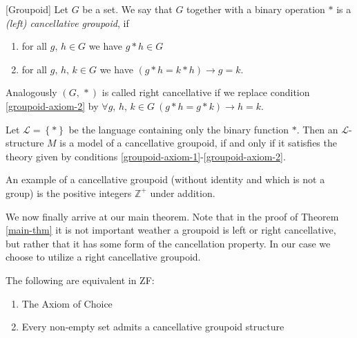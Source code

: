 \documentclass[../../main.tex]{subfiles}
\begin{document}
\begin{definition}\label{groupoid-def}[Groupoid]
    Let $G$ be a set.
    We say that $G$ together with a binary operation $*$ is a \emph{(left) cancellative groupoid}, if 
    \begin{enumerate}[label=(\roman*)]
        \item \label{groupoid-axiom-1} for all $g,\, h \in G$ we have $g * h \in G$
        \item \label{groupoid-axiom-2} for all $g,\, h,\, k \in G$ we have $\left(g * h = k * h\right) \rightarrow g = k$.
    \end{enumerate}
    Analogously $\left(G,\, *\right)$ is called right cancellative if we replace condition \ref{groupoid-axiom-2} by
    $\forall g,\, h,\, k \in G \ \left(g * h = g * k\right) \rightarrow h = k$.

    Let $\mathcal{L} = \left\{*\right\}$ be the language containing only the binary function $*$.
    Then an $\mathcal{L}$-structure $M$ is a model of a cancellative groupoid, 
    if and only if it satisfies the theory given by conditions \ref{groupoid-axiom-1}-\ref{groupoid-axiom-2}.
\end{definition}
An example of a cancellative groupoid (without identity and which is not a group) is the positive integers $\mathbb{Z}^+$ under addition.

We now finally arrive at our main theorem.
Note that in the proof of Theorem \ref{main-thm} it is not important weather a groupoid is left or right cancellative,
but rather that it has some form of the cancellation property.
In our case we choose to utilize a right cancellative groupoid.

\begin{theorem}\cite{Haj72}\label{main-thm}
    The following are equivalent in ZF:
    \begin{enumerate}
        \item The Axiom of Choice
        \item Every non-empty set admits a cancellative groupoid structure
    \end{enumerate}
\end{theorem}
\end{document}
